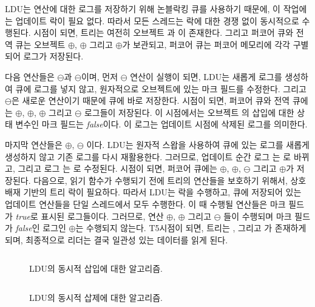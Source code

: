 LDU는 연산에 대한 로그를 저장하기 위해 논블락킹 큐를 사용하기 때문에, 
이 작업에는 업데이트 락이 필요 없다. 
따라서 모든 스레드는 락에 대한 경쟁 없이 동시적으로 수행된다. 
 시점이 되면, 트리는 여전히 오브젝트 과 이 존재한다.
그리고 퍼코어 큐와 전역 큐는 오브젝트 $\oplus$, $\oplus$ 그리고
$\oplus$가 보관되고, 퍼코어 큐는 퍼코어 메모리에 각각 구별되어 로그가 저장된다.

다음 연산들은 $\ominus$과 $\ominus$이며,
먼저 $\ominus$ 연산이 실행이 되면, LDU는 새롭게 로그를 생성하여 큐에 로그를 넣지 않고, 
원자적으로 오브젝트에 있는 마크 필드를 수정한다. 
그리고 $\ominus$은 새로운 연산이기 때문에 큐에 바로 저장한다. 
 시점이 되면, 퍼코어 큐와 전역 큐에는 $\oplus$, $\oplus$,
$\oplus$ 그리고 $\ominus$ 로그들이 저장된다. 
이 시점에서는 오브젝트 의 삽입에 대한 상태 변수인 마크 필드는 \textit{false}이다. 
이 로그는 업데이트 시점에 삭제된 로그를 의미한다.

마지막 연산들은 $\oplus$, $\ominus$ 이다. 
LDU는 원자적 스왑을 사용하여 큐에 있는 로그를 새롭게 생성하지 않고 기존 로그를 다시 재활용한다. 
그러므로, 업데이트 순간 로그 는 로 바뀌고, 그리고 로그 는 로
수정된다.
 시점이 되면, 퍼코어 큐에는 $\oplus$, $\oplus$,
$\ominus$ 그리고 $\oplus$가 저장된다. 
다음으로, 읽기 함수가 수행되기 전에 트리의 연산들을 보호하기 위해서, 상호배재 기반의 트리 락이 필요하다. 
따라서 LDU는 락을 수행하고, 큐에 저장되어 있는 업데이트 연산들을 단일 스레드에서 모두 수행한다. 
이 때 수행될 연산들은 마크 필드가 \textit{true}로 표시된 로그들이다.
그러므로, 연산 $\oplus$, $\oplus$ 그리고 $\ominus$
들이 수행되며 마크 필드가 \textit{false}인 로그인 $\oplus$는 수행되지 않는다. 
T5시점이 되면, 트리는 ,  그리고 가 존재하게되며, 
최종적으로 리더는 결국 일관성 있는 데이터를 읽게 된다.

\begin{figure}[h!]
\begin{center}
\inputminted[linenos,fontsize=\footnotesize, tabsize=4]{c}{src/ldu_logical_a.c}
\end{center}
\caption{LDU의 동시적 삽입에 대한 알고리즘.}
\label{fig:gldulogicalupdatei}
\end{figure}


\begin{figure}[h!]
\begin{center}
\inputminted[linenos,fontsize=\footnotesize, tabsize=4]{c}{src/ldu_logical_b.c}
\end{center}
\caption{LDU의 동시적 삽제에 대한 알고리즘.}
\label{fig:gldulogicalupdater}
\end{figure}


